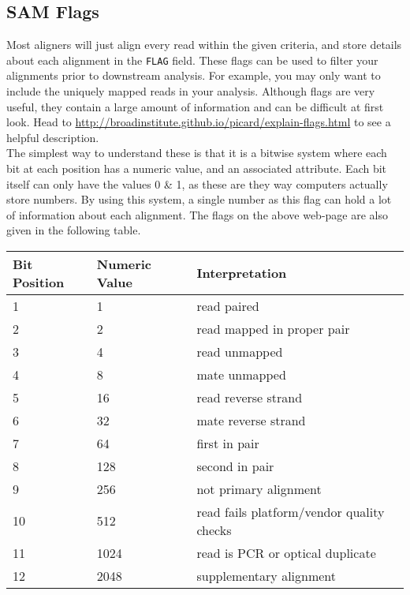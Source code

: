 \subsection{SAM Flags}
\begin{information}
Most aligners will just align every read within the given criteria, and store details about each alignment in the \texttt{FLAG} field.
These flags can be used to filter your alignments prior to downstream analysis.
For example, you may only want to include the uniquely mapped reads in your analysis.
Although flags are very useful, they contain a large amount of information and can be difficult at first look.
Head to \url{http://broadinstitute.github.io/picard/explain-flags.html} to see a helpful description.\\

The simplest way to understand these is that it is a bitwise system where each bit at each position has a numeric value, and an associated attribute.
Each bit itself can only have the values 0 \& 1, as these are they way computers actually store numbers.
By using this system, a single number as this flag can hold a lot of information about each alignment.
The flags on the above web-page are also given in the following table.\\

\begin{tabular}{lll}
	\toprule
	Bit Position & Numeric Value & Interpretation \\
	\midrule
 	1 & 1 & read paired\\
	2 & 2 & read mapped in proper pair\\
  	3 & 4 & read unmapped\\
	4 & 8 & mate unmapped\\
	5 & 16 & read reverse strand\\
	6 & 32 & mate reverse strand\\
	7 & 64 & first in pair\\
	8 & 128 & second in pair\\
	9 & 256 & not primary alignment\\
	10 & 512 & read fails platform/vendor quality checks\\
	11 & 1024 & read is PCR or optical duplicate\\
	12 & 2048 & supplementary alignment\\
  	\bottomrule
\end{tabular}

\end{information}

